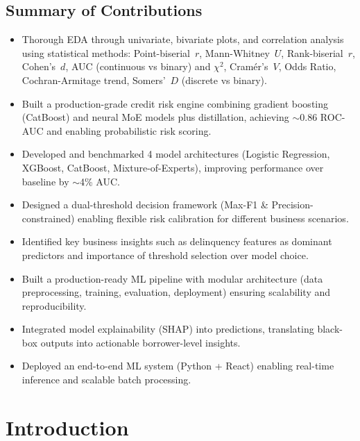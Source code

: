 \documentclass[11pt,a4paper]{article}
\begin{document}
\subsection*{Summary of Contributions}
\small
\begin{itemize}[nosep]
    \item Thorough EDA through univariate, bivariate plots, and correlation analysis using statistical methods: Point-biserial~$r$, Mann-Whitney~$U$, Rank-biserial~$r$, Cohen's~$d$, AUC (continuous vs binary) and $\chi^2$, Cram\'{e}r's~$V$, Odds Ratio, Cochran-Armitage trend, Somers'~$D$ (discrete vs binary).
    \item Built a production-grade credit risk engine combining gradient boosting (CatBoost) and neural MoE models plus distillation, achieving $\sim$0.86 ROC-AUC and enabling probabilistic risk scoring.
    \item Developed and benchmarked 4 model architectures (Logistic Regression, XGBoost, CatBoost, Mixture-of-Experts), improving performance over baseline by $\sim$4\% AUC.
    \item Designed a dual-threshold decision framework (Max-F1 \& Precision-constrained) enabling flexible risk calibration for different business scenarios.
    \item Identified key business insights such as delinquency features as dominant predictors and importance of threshold selection over model choice.
    \item Built a production-ready ML pipeline with modular architecture (data preprocessing, training, evaluation, deployment) ensuring scalability and reproducibility.
    \item Integrated model explainability (SHAP) into predictions, translating black-box outputs into actionable borrower-level insights.
    \item Deployed an end-to-end ML system (Python + React) enabling real-time inference and scalable batch processing.
\end{itemize}
\normalsize

\newpage
\tableofcontents
\newpage

\section{Introduction}
\end{document}
